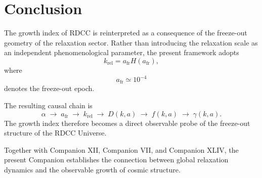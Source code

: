 \documentclass[11pt,a4paper]{article}
\begin{document}
\section{Conclusion}

The growth index of RDCC is reinterpreted as a consequence of the freeze-out
geometry of the relaxation sector. Rather than introducing the relaxation
scale as an independent phenomenological parameter, the present framework
adopts
\begin{equation}
  k_{\mathrm{rel}}
  =
  a_{\mathrm{fr}} H(a_{\mathrm{fr}}),
\end{equation}
where
\begin{equation}
  a_{\mathrm{fr}}
  \simeq
  10^{-4}
\end{equation}
denotes the freeze-out epoch.

The resulting causal chain is
\begin{equation}
  \alpha
  \;\rightarrow\;
  a_{\mathrm{fr}}
  \;\rightarrow\;
  k_{\mathrm{rel}}
  \;\rightarrow\;
  D(k,a)
  \;\rightarrow\;
  f(k,a)
  \;\rightarrow\;
  \gamma(k,a).
\end{equation}
The growth index therefore becomes a direct observable probe of the freeze-out
structure of the RDCC Universe.

Together with Companion XII, Companion VII, and Companion XLIV, the present
Companion establishes the connection between global relaxation dynamics and
the observable growth of cosmic structure.
\end{document}
